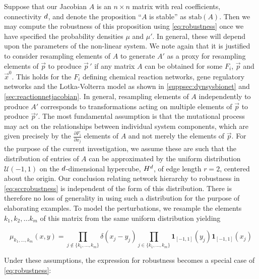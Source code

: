 Suppose that our Jacobian $A$ is an $n \times n$ matrix with real coefficients, connectivity $d$, and denote the proposition ``$A$ is stable'' as $\mathrm{stab}(A)$.  Then we may compute the robustness of this proposition using \ref{eq:robustness} once we have specified the probability densities $\mu$ and $\mu'$.  In general, these will depend upon the parameters of the non-linear system. We note again that it is justified to consider resampling elements of $A$ to generate $A'$ as a proxy for resampling elements of $\vec{p}$ to produce $\vec{p}\,'$ if any matrix $A$ can be obtained for some $F_i$, $\vec{p}$ and $\vec{x}^0$. This holds for the $F_i$ defining chemical reaction networks, gene regulatory networks and the Lotka-Volterra model as shown in \ref{suppsec:dynsysbionet} and \ref{sec:reactionnetjacobian}.
In general, resampling elements of $A$ independently to produce $A'$ corresponds to transformations acting on multiple elements of $\vec{p}$ to produce $\vec{p}'$. The most fundamental assumption is that the mutational process may act on the relationships between individual system components, which are given precisely by the $\frac{\partial F_i}{\partial x_j}$ elements of $A$ and not merely the elements of $\vec{p}$. For the purpose of the current investigation, we assume these are such that the distribution of entries of $A$ can be approximated by the uniform distribution $\mathcal{U}(-1,1)$ on the $d$-dimensional hypercube, $H^d$, of edge length $r=2$, centered about the origin. Our conclusion relating network hierarchy to robustness in \ref{eq:sccrobustness} is independent of the form of this distribution. There is therefore no loss of generality in using such a distribution for the purpose of elaborating examples. To model the perturbations, we resample the elements $k_1, k_2, \ldots k_m$ of this matrix from the same uniform distribution yielding
\begin{widetext}
$$
\mu_{k_1,\ldots,k_m}(x,y) = \prod_{j \notin \{k_1, \ldots, k_m\} } \delta(x_j-y_j) \prod_{j \in \{k_1,\ldots,k_m\}} \mathbf{1}_{[-1,1]} (y_j) \mathbf{1}_{[-1,1]} (x_j)
$$
\end{widetext}
Under these assumptions, the expression for robustness becomes a special case of \ref{eq:robustness}:

